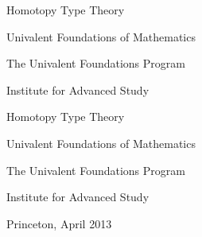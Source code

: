 \pagestyle{empty}
%

%
\vspace*{0.03\textheight}
{\centering
{\color{orange}\fontsize{49}{60}\selectfont%
Homotopy Type Theory}\par
\vspace*{17pt}
{\color{orange}\fontsize{32}{40}\selectfont%
Univalent Foundations of Mathematics}\par}
\vfill
{\centering
{\color{orange}\fontsize{22}{25}\selectfont%
The Univalent Foundations Program\par
\vspace*{8pt}
Institute for Advanced Study}\par}
\vspace*{0.03\textheight}

\cleardoublepage
\setcounter{page}{1}


\vspace*{0.1\textheight}
{\centering

{\fontsize{49}{60}\selectfont%
Homotopy Type Theory}\par
\vspace*{17pt}
{\fontsize{32}{40}\selectfont%
Univalent Foundations of Mathematics}\par
\vspace*{70pt}
{\fontsize{25}{30}\selectfont%
The Univalent Foundations Program\par}}
\vfill
{\centering
{\fontsize{22}{25}\selectfont%
Institute for Advanced Study\par
\vspace*{8pt}
Princeton, April 2013\par}}
\vspace{0.03\textheight}
\hbox{}

\clearpage

%
\hbox{}
\vfill

